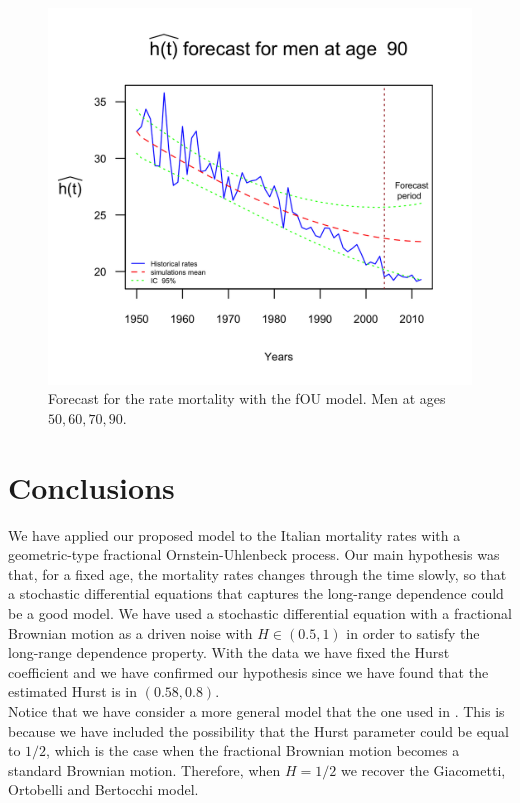 \documentclass[smallextended]{svjour3}
\begin{document}
\begin{figure}[H]
    \includegraphics{PlotMenForecast90.png}
    \caption{Forecast for the rate mortality with the fOU model. Men at ages
    $50,60,70,90$.}
    \label{graph-forecast_men_FOU2}
\end{figure}\vspace*{0.1cm}


\section{Conclusions}\label{sec:Conclutions}

We have applied our proposed model to the Italian mortality rates with a
geometric-type fractional Ornstein-Uhlenbeck process. Our
main hypothesis was that, for a fixed age, the mortality rates changes through
the time slowly, so that a stochastic differential equations
that captures the long-range dependence could be a good model. We have used a
stochastic differential equation with a fractional Brownian motion as a driven
noise with $H\in (0.5,1)$ in order to satisfy the long-range dependence
property. With the data we have fixed the Hurst coefficient and we have
confirmed our hypothesis since
we have found that the estimated Hurst is in $(0.58,0.8)$.  \\



Notice that we have consider a more general model that the one used in
\cite{gi-or-be}. This is because we have included the possibility that the
Hurst parameter could be equal to $1/2$, which is the case when the fractional
Brownian motion becomes a standard Brownian motion. Therefore,
when $H=1/2$ we recover the  Giacometti, Ortobelli and Bertocchi model.\\
\end{document}
